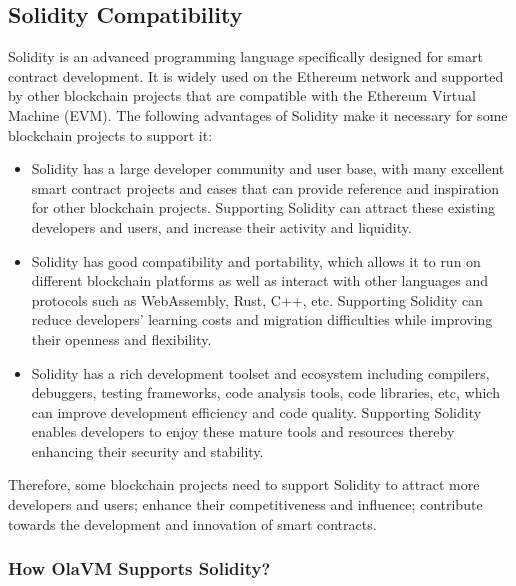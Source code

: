 \subsection{Solidity Compatibility}\label{section: solidity-compatibility}

Solidity is an advanced programming language specifically designed for smart contract development. It is widely used on the Ethereum network and supported by other blockchain projects that are compatible with the Ethereum Virtual Machine (EVM). The following advantages of Solidity make it necessary for some blockchain projects to support it:

\begin{itemize}
    \item Solidity has a large developer community and user base, with many excellent smart contract projects and cases that can provide reference and inspiration for other blockchain projects. Supporting Solidity can attract these existing developers and users, and increase their activity and liquidity.
    \item Solidity has good compatibility and portability, which allows it to run on different blockchain platforms as well as interact with other languages and protocols such as WebAssembly, Rust, C++, etc. Supporting Solidity can reduce developers' learning costs and migration difficulties while improving their openness and flexibility.
    \item Solidity has a rich development toolset and ecosystem including compilers, debuggers, testing frameworks, code analysis tools, code libraries, etc, which can improve development efficiency and code quality. Supporting Solidity enables developers to enjoy these mature tools and resources thereby enhancing their security and stability.
\end{itemize}

Therefore, some blockchain projects need to support Solidity to attract more developers and users; enhance their competitiveness and influence; contribute towards the development and innovation of smart contracts.


\subsubsection{How OlaVM Supports Solidity?}

